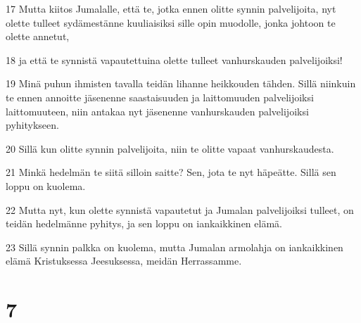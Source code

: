 \par 17 Mutta kiitos Jumalalle, että te, jotka ennen olitte synnin palvelijoita, nyt olette tulleet sydämestänne kuuliaisiksi sille opin muodolle, jonka johtoon te olette annetut,
\par 18 ja että te synnistä vapautettuina olette tulleet vanhurskauden palvelijoiksi!
\par 19 Minä puhun ihmisten tavalla teidän lihanne heikkouden tähden. Sillä niinkuin te ennen annoitte jäsenenne saastaisuuden ja laittomuuden palvelijoiksi laittomuuteen, niin antakaa nyt jäsenenne vanhurskauden palvelijoiksi pyhitykseen.
\par 20 Sillä kun olitte synnin palvelijoita, niin te olitte vapaat vanhurskaudesta.
\par 21 Minkä hedelmän te siitä silloin saitte? Sen, jota te nyt häpeätte. Sillä sen loppu on kuolema.
\par 22 Mutta nyt, kun olette synnistä vapautetut ja Jumalan palvelijoiksi tulleet, on teidän hedelmänne pyhitys, ja sen loppu on iankaikkinen elämä.
\par 23 Sillä synnin palkka on kuolema, mutta Jumalan armolahja on iankaikkinen elämä Kristuksessa Jeesuksessa, meidän Herrassamme.

\chapter{7}

